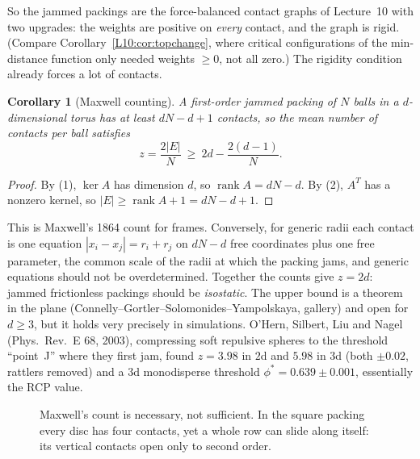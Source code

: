 \documentclass[11pt,openany]{book}
\theoremstyle{plain}
\newtheorem{corollary}[theorem]{Corollary}
\theoremstyle{definition}
\theoremstyle{remark}
\newcommand{\abs}[1]{\left\lvert #1 \right\rvert}
\begin{document}
So the jammed packings are the force-balanced contact graphs of Lecture~10 with two upgrades: the
weights are positive on \emph{every} contact, and the graph is rigid. (Compare
Corollary~\ref{L10:cor:topchange}, where critical configurations of the min-distance function only
needed weights $\ge0$, not all zero.) The rigidity condition already forces a lot of contacts.

\begin{corollary}[Maxwell counting]\label{SM:cor:maxwell}
A first-order jammed packing of $N$ balls in a $d$-dimensional torus has at least $dN-d+1$ contacts, so the
mean number of contacts per ball satisfies
\[
  z=\frac{2\abs E}{N}\ \ge\ 2d-\frac{2(d-1)}{N}.
\]
\end{corollary}

\begin{proof}
By (1), $\ker A$ has dimension $d$, so $\operatorname{rank}A=dN-d$. By (2), $A^T$ has a nonzero kernel, so
$\abs E\ge\operatorname{rank}A+1=dN-d+1$.
\end{proof}

This is Maxwell's 1864 count for frames. Conversely, for generic radii each contact is one equation
$\abs{x_i-x_j}=r_i+r_j$ on $dN-d$ free coordinates plus one free parameter, the common scale of the radii
at which the packing jams, and generic equations should not be overdetermined.
Together the counts give $z=2d$: jammed frictionless packings should be \emph{isostatic}. The upper bound
is a theorem in the plane (Connelly--Gortler--Solomonides--Yampolskaya, gallery) and open for $d\ge3$, but
it holds very precisely in simulations. O'Hern, Silbert, Liu and Nagel (Phys.\ Rev.~E 68, 2003), compressing
soft repulsive spheres to the threshold ``point~J'' where they first jam, found $z=3.98$ in $2$d and $5.98$ in
$3$d (both $\pm0.02$, rattlers removed) and a $3$d monodisperse threshold $\phi^*=0.639\pm0.001$,
essentially the RCP value.

\begin{figure}[ht]
\centering
{}
\caption{Maxwell's count is necessary, not sufficient. In the square packing every disc has four
contacts, yet a whole row can slide along itself: its vertical contacts open only to second order.}
\label{SM:fig:maxwell}
\end{figure}
\end{document}
